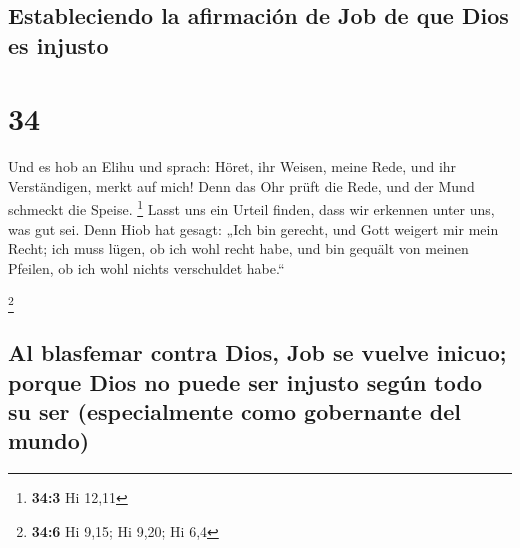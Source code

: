\hypertarget{estableciendo-la-afirmaciuxf3n-de-job-de-que-dios-es-injusto}{%
\subsection{Estableciendo la afirmación de Job de que Dios es
injusto}\label{estableciendo-la-afirmaciuxf3n-de-job-de-que-dios-es-injusto}}

\hypertarget{section-33}{%
\section{34}\label{section-33}}

 Und es hob an Elihu und sprach:  Höret, ihr
Weisen, meine Rede, und ihr Verständigen, merkt auf mich! 
Denn das Ohr prüft die Rede, und der Mund schmeckt die Speise.
\footnote{\textbf{34:3} Hi 12,11}  Lasst uns ein Urteil
finden, dass wir erkennen unter uns, was gut sei.  Denn
Hiob hat gesagt: „Ich bin gerecht, und Gott weigert mir mein Recht;
 ich muss lügen, ob ich wohl recht habe, und bin gequält
von meinen Pfeilen, ob ich wohl nichts verschuldet habe.``

\footnote{\textbf{34:6} Hi 9,15; Hi 9,20; Hi 6,4}

\hypertarget{al-blasfemar-contra-dios-job-se-vuelve-inicuo-porque-dios-no-puede-ser-injusto-seguxfan-todo-su-ser-especialmente-como-gobernante-del-mundo}{%
\subsection{Al blasfemar contra Dios, Job se vuelve inicuo; porque Dios
no puede ser injusto según todo su ser (especialmente como gobernante
del
mundo)}\label{al-blasfemar-contra-dios-job-se-vuelve-inicuo-porque-dios-no-puede-ser-injusto-seguxfan-todo-su-ser-especialmente-como-gobernante-del-mundo}}

